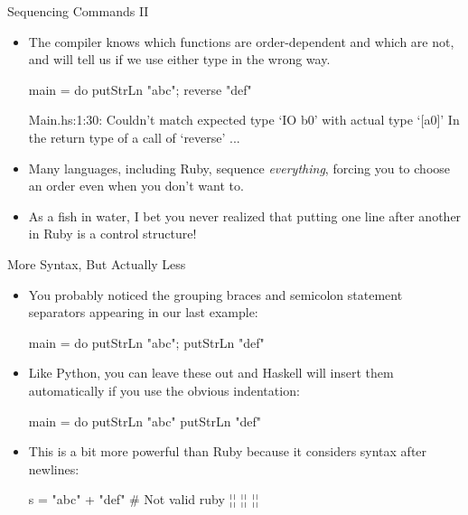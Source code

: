 \documentclass[xcolor=dvipsnames]{beamer}          %
\newcommand{\lH}[1]{\color{MidnightBlue}{#1}}
\begin{document}
\begin{frame}[fragile]{Sequencing Commands II}
\begin{itemize}
    \item The compiler knows which functions are order-dependent and
        which are not, and will tell us if we use either type in the wrong way.
        \begin{hlisting}
            main =  do { putStrLn "abc"; reverse "def" }
        \end{hlisting}
        \begin{olisting}
            Main.hs:1:30:
                Couldn't match expected type `IO b0' with
                    actual type `[a0]'
                In the return type of a call of `reverse'
                ...
        \end{olisting}
    \item Many languages, including Ruby, sequence \emph{everything},
        forcing you to choose an order even when you don't want to.
    \item As a fish in water, I bet you never realized that putting one
        line after another in Ruby is a control structure!
\end{itemize}
\end{frame}

\begin{frame}[fragile]{More Syntax, But Actually Less}
\begin{itemize}
    \item You probably noticed the grouping braces and semicolon
        statement separators appearing in our last example:
        \begin{hlisting}
            main = do { putStrLn "abc"; putStrLn "def" }
        \end{hlisting}
    \item Like Python, you can leave these out and Haskell will insert
        them automatically if you use the obvious indentation:
        \begin{hlisting}
            main =
                 do putStrLn "abc"
                    putStrLn "def"
        \end{hlisting}
    \item This is a bit more powerful than Ruby because it considers
        syntax after newlines:
        \begin{rlisting}
            s  = "abc"
               + "def"       # Not valid ruby
            ¦\lH{s { }= "abc"}¦
              ¦\lH{++ "def}¦       ¦\lH{\HH But ok in Haskell}¦
        \end{rlisting}
\end{itemize}
\end{frame}
\end{document}
